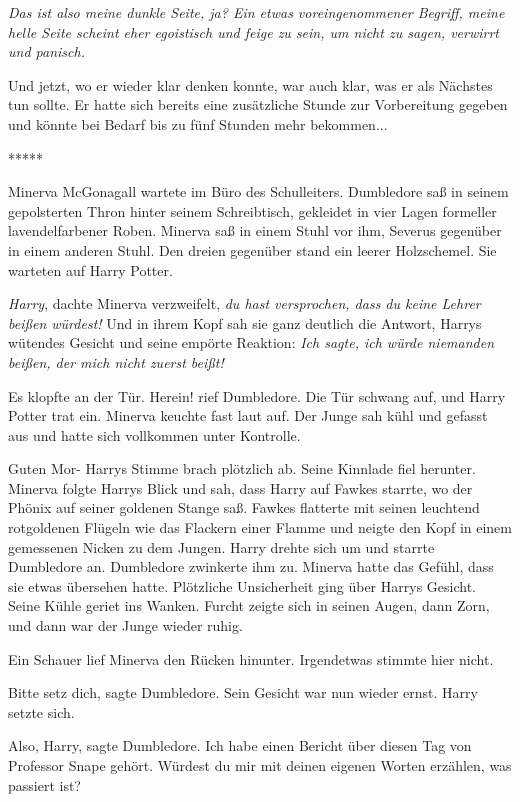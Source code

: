\emph{Das ist also meine dunkle Seite, ja? Ein etwas voreingenommener Begriff,
meine helle Seite scheint eher egoistisch und feige zu sein, um nicht zu sagen,
verwirrt und panisch.}

Und jetzt, wo er wieder klar denken konnte, war auch klar, was er als Nächstes
tun sollte. Er hatte sich bereits eine zusätzliche Stunde zur Vorbereitung
gegeben und könnte bei Bedarf bis zu fünf Stunden mehr bekommen...

\begin{center}*****\end{center}

Minerva McGonagall wartete im Büro des Schulleiters. Dumbledore saß in seinem
gepolsterten Thron hinter seinem Schreibtisch, gekleidet in vier Lagen formeller
lavendelfarbener Roben. Minerva saß in einem Stuhl vor ihm, Severus gegenüber in
einem anderen Stuhl. Den dreien gegenüber stand ein leerer Holzschemel. Sie
warteten auf Harry Potter.

\emph{Harry}, dachte Minerva verzweifelt, \emph{du hast versprochen, dass du
keine Lehrer beißen würdest!} Und in ihrem Kopf sah sie ganz deutlich die
Antwort, Harrys wütendes Gesicht und seine empörte Reaktion: \emph{Ich sagte,
ich würde niemanden beißen, der mich nicht zuerst beißt!}

Es klopfte an der Tür. \glqq Herein!\grqq{} rief Dumbledore. Die Tür schwang
auf, und Harry Potter trat ein. Minerva keuchte fast laut auf. Der Junge sah
kühl und gefasst aus und hatte sich vollkommen unter Kontrolle.

\glqq Guten Mor-\grqq{} Harrys Stimme brach plötzlich ab. Seine Kinnlade fiel
herunter. Minerva folgte Harrys Blick und sah, dass Harry auf Fawkes starrte, wo
der Phönix auf seiner goldenen Stange saß. Fawkes flatterte mit seinen leuchtend
rotgoldenen Flügeln wie das Flackern einer Flamme und neigte den Kopf in einem
gemessenen Nicken zu dem Jungen. Harry drehte sich um und starrte Dumbledore an.
Dumbledore zwinkerte ihm zu. Minerva hatte das Gefühl, dass sie etwas übersehen
hatte. Plötzliche Unsicherheit ging über Harrys Gesicht. Seine Kühle geriet ins
Wanken. Furcht zeigte sich in seinen Augen, dann Zorn, und dann war der Junge
wieder ruhig.

Ein Schauer lief Minerva den Rücken hinunter. Irgendetwas stimmte hier nicht.

\glqq Bitte setz dich\grqq{}, sagte Dumbledore. Sein Gesicht war nun wieder
ernst. Harry setzte sich.

\glqq Also, Harry\grqq{}, sagte Dumbledore. \glqq Ich habe einen Bericht über
diesen Tag von Professor Snape gehört. Würdest du mir mit deinen eigenen Worten
erzählen, was passiert ist?\grqq{}

